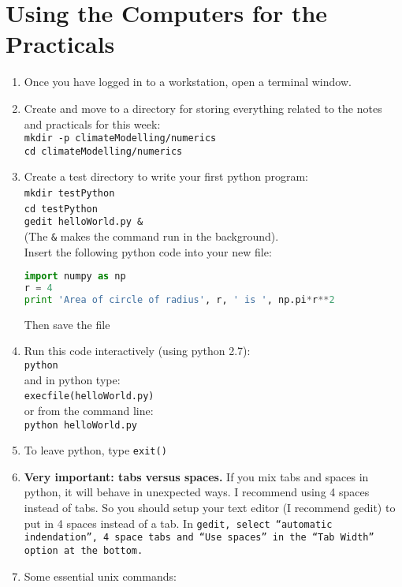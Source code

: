 \clearpage{}

\section{Using the Computers for the Practicals}
\begin{enumerate}
\item Once you have logged in to a workstation, open a terminal window.
\item Create and move to a directory for storing everything related to the
notes and practicals for this week:\\
\texttt{mkdir -p climateModelling/numerics}\\
\texttt{cd climateModelling/numerics}
\item Create a test directory to write your first python program:\\
\texttt{mkdir testPython}~\\
\texttt{cd testPython}~\\
\texttt{gedit helloWorld.py \&}\\
(The \texttt{\&} makes the command run in the background). \\
Insert the following python code into your new file:\\
\begin{lstlisting}[language=Python]
import numpy as np
r = 4
print 'Area of circle of radius', r, ' is ', np.pi*r**2
\end{lstlisting}
Then save the file
\item Run this code interactively (using python 2.7):\\
\texttt{python}\\
and in python type:\\
\texttt{execfile(\textquotedbl{}helloWorld.py\textquotedbl{})}~\\
or from the command line:\\
\texttt{python helloWorld.py}
\item To leave python, type \texttt{exit()}
\item \textbf{Very important: tabs versus spaces.} If you mix tabs and spaces
in python, it will behave in unexpected ways. I recommend using 4
spaces instead of tabs. So you should setup your text editor (I recommend
gedit) to put in 4 spaces instead of a tab. In \texttt{gedit, select
``automatic indendation'', 4 space tabs and ``Use spaces'' in
the ``Tab Width'' option at the bottom.}
\item Some essential unix commands:


\end{enumerate}
